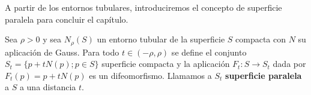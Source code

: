 A partir de los entornos tubulares, introduciremos el concepto de superficie paralela para concluir el capítulo.

\begin{definition}
Sea $\rho > 0$ y sea $N_\rho(S)$ un entorno tubular de la superficie $S$ compacta con $N$ su aplicación de Gauss. Para todo $t \in (-\rho, \rho)$ se define el conjunto $S_t=\{p + tN(p); p \in S\}$ superficie compacta y la aplicación $F_t: S \longrightarrow S_t$ dada por $F_t(p)=p+tN(p)$ es un difeomorfismo.
Llamamos a $S_t$ \textbf{superficie paralela} a $S$ a una distancia $t$.
\end{definition}